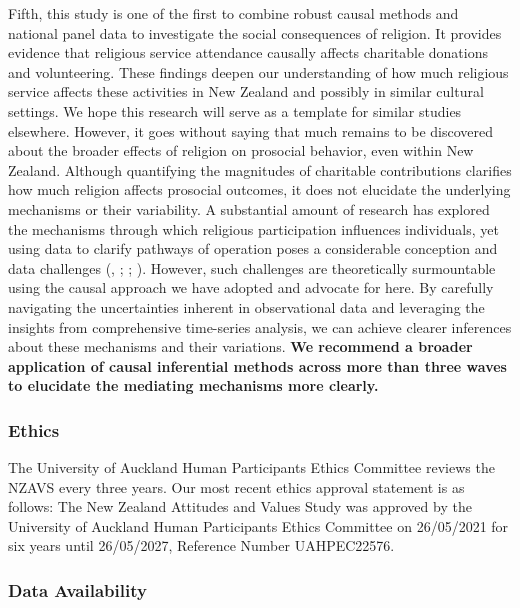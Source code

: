 \documentclass[
  single column]{article}
\begin{document}
Fifth, this study is one of the first to combine robust causal methods
and national panel data to investigate the social consequences of
religion. It provides evidence that religious service attendance
causally affects charitable donations and volunteering. These findings
deepen our understanding of how much religious service affects these
activities in New Zealand and possibly in similar cultural settings. We
hope this research will serve as a template for similar studies
elsewhere. However, it goes without saying that much remains to be
discovered about the broader effects of religion on prosocial behavior,
even within New Zealand. Although quantifying the magnitudes of
charitable contributions clarifies how much religion affects prosocial
outcomes, it does not elucidate the underlying mechanisms or their
variability. A substantial amount of research has explored the
mechanisms through which religious participation influences individuals,
yet using data to clarify pathways of operation poses a considerable
conception and data challenges
(,
; ; ).
However, such challenges are theoretically surmountable using the causal
approach we have adopted and advocate for here. By carefully navigating
the uncertainties inherent in observational data and leveraging the
insights from comprehensive time-series analysis, we can achieve clearer
inferences about these mechanisms and their variations. \textbf{We
recommend a broader application of causal inferential methods across
more than three waves to elucidate the mediating mechanisms more
clearly.}

\newpage{}

\subsubsection{Ethics}\label{ethics}

The University of Auckland Human Participants Ethics Committee reviews
the NZAVS every three years. Our most recent ethics approval statement
is as follows: The New Zealand Attitudes and Values Study was approved
by the University of Auckland Human Participants Ethics Committee on
26/05/2021 for six years until 26/05/2027, Reference Number UAHPEC22576.

\subsubsection{Data Availability}\label{data-availability}
\end{document}
